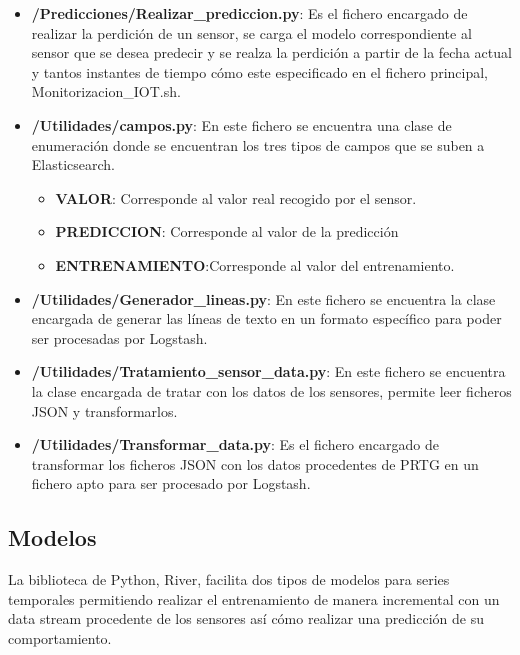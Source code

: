 \begin{itemize}
    \item \textbf{/Predicciones/Realizar\_prediccion.py}: Es el fichero encargado de realizar la perdición de un sensor, se carga el modelo correspondiente al sensor que se desea predecir y se realza la perdición a partir de la fecha actual y tantos instantes de tiempo cómo este especificado en el fichero principal, Monitorizacion\_IOT.sh.
    
    \item \textbf{/Utilidades/campos.py}: En este fichero se encuentra una clase de enumeración donde se encuentran los tres tipos de campos que se suben a Elasticsearch.
    \begin{itemize}
        \item \textbf{VALOR}: Corresponde al valor real recogido por el sensor.

        \item \textbf{PREDICCION}: Corresponde al valor de la predicción 
        \item \textbf{ENTRENAMIENTO}:Corresponde al valor del entrenamiento.
    \end{itemize}
    
    \item \textbf{/Utilidades/Generador\_lineas.py}: En este fichero se encuentra la clase encargada de generar las líneas de texto en un formato específico para poder ser procesadas por Logstash. 
    
    \item \textbf{/Utilidades/Tratamiento\_sensor\_data.py}: En este fichero se encuentra la clase encargada de tratar con los datos de los sensores, permite leer ficheros JSON y transformarlos.
    
    \item \textbf{/Utilidades/Transformar\_data.py}: Es el fichero encargado de transformar los ficheros JSON con los datos procedentes de PRTG en un fichero apto para ser procesado por Logstash. 
    
\end{itemize}

\subsection{Modelos}

La biblioteca de Python, River, facilita dos tipos de modelos para series temporales permitiendo realizar el entrenamiento de manera incremental con un data stream procedente de los sensores así cómo realizar una predicción de su comportamiento.

